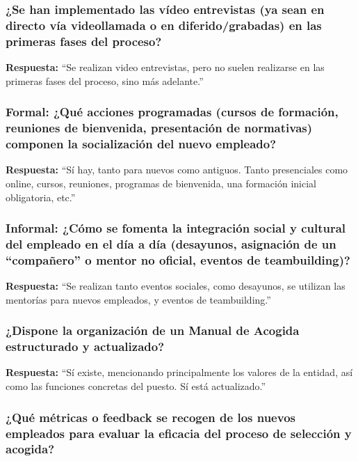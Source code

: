 \subsubsection*{¿Se han implementado las vídeo entrevistas (ya sean en directo vía videollamada o en diferido/grabadas) en las primeras fases del proceso?}

\textbf{Respuesta:}\newline
``Se realizan video entrevistas, pero no suelen realizarse en las primeras fases del proceso, sino más adelante.''

\subsubsection*{Formal: ¿Qué acciones programadas (cursos de formación, reuniones de bienvenida, presentación de normativas) componen la socialización del nuevo empleado?}

\textbf{Respuesta:}\newline
``Sí hay, tanto para nuevos como antiguos. Tanto presenciales como online, cursos, reuniones, programas de bienvenida, una formación inicial obligatoria, etc.''

\subsubsection*{Informal: ¿Cómo se fomenta la integración social y cultural del empleado en el día a día (desayunos, asignación de un ``compañero'' o mentor no oficial, eventos de teambuilding)?}

\textbf{Respuesta:}\newline
``Se realizan tanto eventos sociales, como desayunos, se utilizan las mentorías para nuevos empleados, y eventos de teambuilding.''

\subsubsection*{¿Dispone la organización de un Manual de Acogida estructurado y actualizado?}

\textbf{Respuesta:}\newline
``Sí existe, mencionando principalmente los valores de la entidad, así como las funciones concretas del puesto. Sí está actualizado.''

\subsubsection*{¿Qué métricas o feedback se recogen de los nuevos empleados para evaluar la eficacia del proceso de selección y acogida?}

